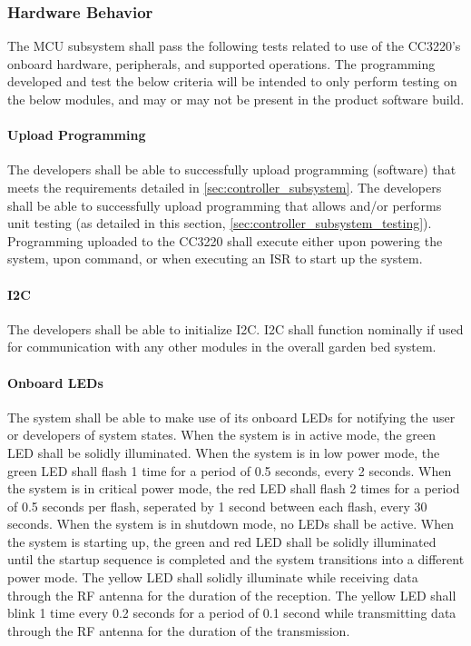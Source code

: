 \subsubsection{Hardware Behavior}
The MCU subsystem shall pass the following tests related to use of the
CC3220's onboard hardware, peripherals, and supported operations. The
programming developed and test the below criteria will be intended to only
perform testing on the below modules, and may or may not be present in the
product software build.

\paragraph{Upload Programming} The developers shall be able to successfully
upload programming (software) that meets the requirements detailed in
\autoref{sec:controller_subsystem}. The developers shall be able to
successfully upload programming that allows and/or performs unit testing
(as detailed in this section, \autoref{sec:controller_subsystem_testing}).
Programming uploaded to the CC3220 shall execute either upon powering the
system, upon command, or when executing an ISR to start up the system.

\paragraph{I2C} The developers shall be able to initialize I2C. I2C shall
function nominally if used for communication with any other modules in the
overall garden bed system.

\paragraph{Onboard LEDs} The system shall be able to make use of its onboard
LEDs for notifying the user or developers of system states. 
When the system is in active mode, the green LED shall be solidly illuminated.
When the system is in low power mode, the green LED shall flash 1 time for a
period of 0.5 seconds, every 2 seconds. When the system is in critical power
mode, the red LED shall flash 2 times for a period of 0.5 seconds per flash,
seperated by 1 second between each flash, every 30 seconds. When the system is
in shutdown mode, no LEDs shall be active. When the system is starting up, the
green and red LED shall be solidly illuminated until the startup sequence is
completed and the system transitions into a different power mode. The yellow
LED shall solidly illuminate while receiving data through the RF antenna for
the duration of the reception.
The yellow LED shall blink 1 time every 0.2 seconds for a period of 0.1 second
while transmitting data through the RF antenna for the duration of the
transmission.

